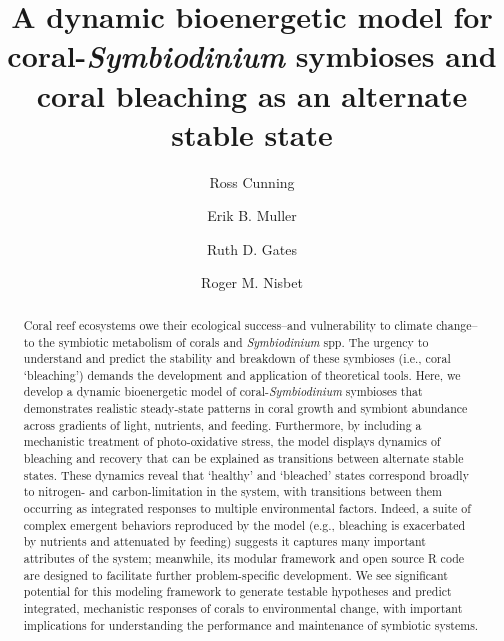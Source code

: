 \documentclass[]{elsarticle} %
\begin{document}
\begin{frontmatter}

  \title{A dynamic bioenergetic model for coral-\emph{Symbiodinium} symbioses and
coral bleaching as an alternate stable state}
    \author[HIMB]{Ross Cunning}
    \author[UCSB,MSI]{Erik B. Muller}
  
  
    \author[HIMB]{Ruth D. Gates}
  
  
    \author[UCSB]{Roger M. Nisbet}
  
  
      \address[HIMB]{Hawaii Institute of Marine Biology, School of Ocean and Earth Science
and Technology, University of Hawaii at Manoa, USA}
    \address[UCSB]{Department of Ecology, Evolution, and Marine Biology, University of
California, Santa Barbara, USA}
    \address[MSI]{Marine Science Institute, University of California, Santa Barbara, USA}
  
  \begin{abstract}
  Coral reef ecosystems owe their ecological success--and vulnerability to
  climate change--to the symbiotic metabolism of corals and
  \emph{Symbiodinium} spp. The urgency to understand and predict the
  stability and breakdown of these symbioses (i.e., coral `bleaching')
  demands the development and application of theoretical tools. Here, we
  develop a dynamic bioenergetic model of coral-\emph{Symbiodinium}
  symbioses that demonstrates realistic steady-state patterns in coral
  growth and symbiont abundance across gradients of light, nutrients, and
  feeding. Furthermore, by including a mechanistic treatment of
  photo-oxidative stress, the model displays dynamics of bleaching and
  recovery that can be explained as transitions between alternate stable
  states. These dynamics reveal that `healthy' and `bleached' states
  correspond broadly to nitrogen- and carbon-limitation in the system,
  with transitions between them occurring as integrated responses to
  multiple environmental factors. Indeed, a suite of complex emergent
  behaviors reproduced by the model (e.g., bleaching is exacerbated by
  nutrients and attenuated by feeding) suggests it captures many important
  attributes of the system; meanwhile, its modular framework and open
  source R code are designed to facilitate further problem-specific
  development. We see significant potential for this modeling framework to
  generate testable hypotheses and predict integrated, mechanistic
  responses of corals to environmental change, with important implications
  for understanding the performance and maintenance of symbiotic systems.
  \end{abstract}
  
 \end{frontmatter}
\end{document}
